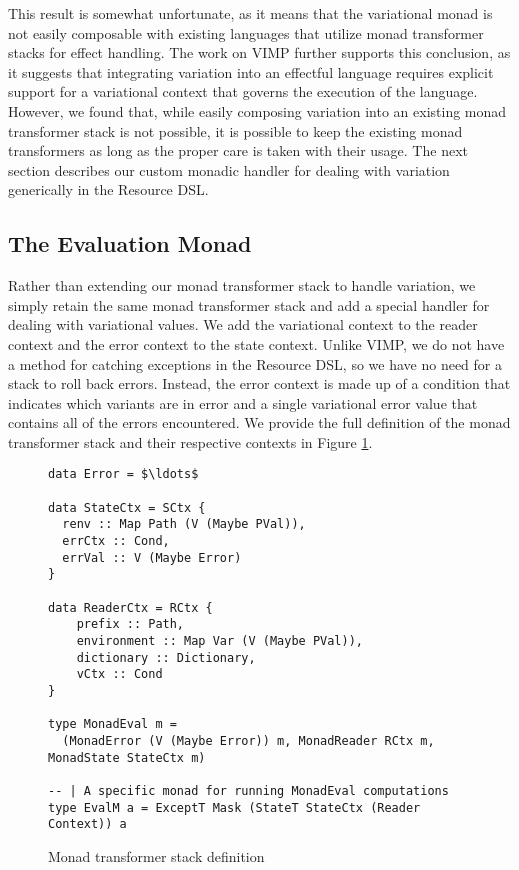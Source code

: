 \documentclass[12pt,oneside]{book}
\begin{document}
This result is somewhat unfortunate, as it means that the variational monad is not easily composable with existing languages
that utilize monad transformer stacks for effect handling. The work on VIMP further supports this conclusion, as it suggests that
integrating variation into an effectful language requires explicit support for a variational context that governs the execution of the
language. However, we found that, while easily composing variation into an existing monad transformer stack is not possible, it
is possible to keep the existing monad transformers as long as the proper care is taken with their usage. The next section
describes our custom monadic handler for dealing with variation generically in the Resource DSL.

\subsection{The Evaluation Monad}
\label{sec:evalmonad}

Rather than extending our monad transformer stack to handle variation, we simply retain the same monad transformer stack
and add a special handler for dealing with variational values. We add the variational context to the reader context and the error
context to the state context. Unlike VIMP, we do not have a method for catching exceptions in the Resource DSL, so we have
no need for a stack to roll back errors. Instead, the error context is made up of a condition that indicates which variants are in error
and a single variational error value that contains all of the errors encountered. We provide the full definition of the monad transformer
stack and their respective contexts in Figure \ref{fig:transstack}.

\begin{figure}
\begin{lstlisting}
data Error = $\ldots$

data StateCtx = SCtx {
  renv :: Map Path (V (Maybe PVal)),
  errCtx :: Cond,
  errVal :: V (Maybe Error)
}

data ReaderCtx = RCtx {
    prefix :: Path,
    environment :: Map Var (V (Maybe PVal)),
    dictionary :: Dictionary,
    vCtx :: Cond
}

type MonadEval m =
  (MonadError (V (Maybe Error)) m, MonadReader RCtx m, MonadState StateCtx m)

-- | A specific monad for running MonadEval computations
type EvalM a = ExceptT Mask (StateT StateCtx (Reader Context)) a
\end{lstlisting}
\caption{Monad transformer stack definition}
\label{fig:transstack}
\end{figure}
\end{document}
